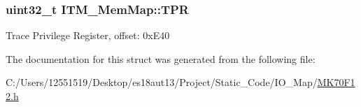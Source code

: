 \subsubsection[{T\+P\+R}]{\setlength{\rightskip}{0pt plus 5cm}uint32\+\_\+t I\+T\+M\+\_\+\+Mem\+Map\+::\+T\+P\+R}\label{struct_i_t_m___mem_map_a24ac79f5d070330282c6c0feae3cbcc1}
Trace Privilege Register, offset\+: 0x\+E40 

The documentation for this struct was generated from the following file\+:\begin{DoxyCompactItemize}
\item 
C\+:/\+Users/12551519/\+Desktop/es18aut13/\+Project/\+Static\+\_\+\+Code/\+I\+O\+\_\+\+Map/\hyperlink{_m_k70_f12_8h}{M\+K70\+F12.\+h}\end{DoxyCompactItemize}
